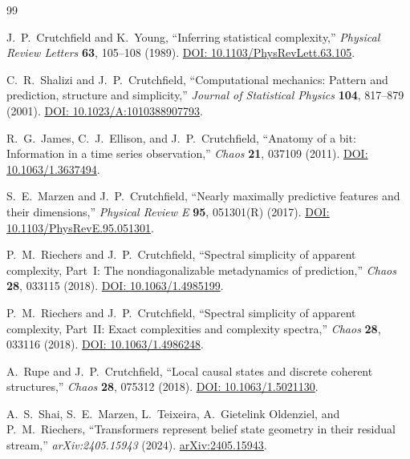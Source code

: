 \documentclass[11pt,a4paper]{article}
\theoremstyle{plain}
\theoremstyle{definition}
\theoremstyle{remark}
\begin{document}
\begin{thebibliography}{99}

J.~P.~Crutchfield and K.~Young,
``Inferring statistical complexity,''
\emph{Physical Review Letters} \textbf{63}, 105--108 (1989).
\href{https://doi.org/10.1103/PhysRevLett.63.105}{DOI: 10.1103/PhysRevLett.63.105}.

C.~R.~Shalizi and J.~P.~Crutchfield,
``Computational mechanics: Pattern and prediction, structure and simplicity,''
\emph{Journal of Statistical Physics} \textbf{104}, 817--879 (2001).
\href{https://doi.org/10.1023/A:1010388907793}{DOI: 10.1023/A:1010388907793}.

R.~G.~James, C.~J.~Ellison, and J.~P.~Crutchfield,
``Anatomy of a bit: Information in a time series observation,''
\emph{Chaos} \textbf{21}, 037109 (2011).
\href{https://doi.org/10.1063/1.3637494}{DOI: 10.1063/1.3637494}.

S.~E.~Marzen and J.~P.~Crutchfield,
``Nearly maximally predictive features and their dimensions,''
\emph{Physical Review E} \textbf{95}, 051301(R) (2017).
\href{https://doi.org/10.1103/PhysRevE.95.051301}{DOI: 10.1103/PhysRevE.95.051301}.

P.~M.~Riechers and J.~P.~Crutchfield,
``Spectral simplicity of apparent complexity, Part~I: The nondiagonalizable metadynamics of prediction,''
\emph{Chaos} \textbf{28}, 033115 (2018).
\href{https://doi.org/10.1063/1.4985199}{DOI: 10.1063/1.4985199}.

P.~M.~Riechers and J.~P.~Crutchfield,
``Spectral simplicity of apparent complexity, Part~II: Exact complexities and complexity spectra,''
\emph{Chaos} \textbf{28}, 033116 (2018).
\href{https://doi.org/10.1063/1.4986248}{DOI: 10.1063/1.4986248}.

A.~Rupe and J.~P.~Crutchfield,
``Local causal states and discrete coherent structures,''
\emph{Chaos} \textbf{28}, 075312 (2018).
\href{https://doi.org/10.1063/1.5021130}{DOI: 10.1063/1.5021130}.

A.~S.~Shai, S.~E.~Marzen, L.~Teixeira, A.~Gietelink Oldenziel, and P.~M.~Riechers,
``Transformers represent belief state geometry in their residual stream,''
\emph{arXiv:2405.15943} (2024).
\href{https://arxiv.org/abs/2405.15943}{arXiv:2405.15943}.

\end{thebibliography}
\end{document}
